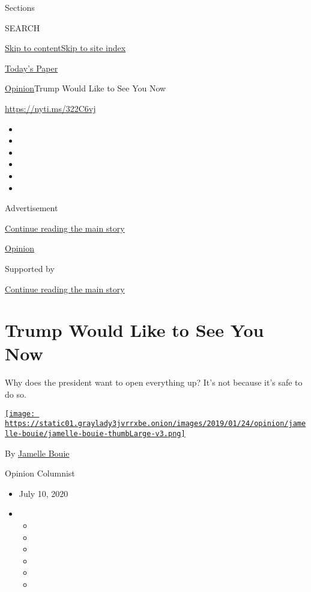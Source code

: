 Sections

SEARCH

\protect\hyperlink{site-content}{Skip to
content}\protect\hyperlink{site-index}{Skip to site index}

\href{https://myaccount.nytimes3xbfgragh.onion/auth/login?response_type=cookie\&client_id=vi}{}

\href{https://www.nytimes3xbfgragh.onion/section/todayspaper}{Today's
Paper}

\href{/section/opinion}{Opinion}\textbar{}Trump Would Like to See You
Now

\href{https://nyti.ms/322C6vj}{https://nyti.ms/322C6vj}

\begin{itemize}
\item
\item
\item
\item
\item
\item
\end{itemize}

Advertisement

\protect\hyperlink{after-top}{Continue reading the main story}

\href{/section/opinion}{Opinion}

Supported by

\protect\hyperlink{after-sponsor}{Continue reading the main story}

\hypertarget{trump-would-like-to-see-you-now}{%
\section{Trump Would Like to See You
Now}\label{trump-would-like-to-see-you-now}}

Why does the president want to open everything up? It's not because it's
safe to do so.

\href{https://www.nytimes3xbfgragh.onion/column/jamelle-bouie}{\texttt{[image: https://static01.graylady3jvrrxbe.onion/images/2019/01/24/opinion/jamelle-bouie/jamelle-bouie-thumbLarge-v3.png]}}

By
\href{https://www.nytimes3xbfgragh.onion/column/jamelle-bouie}{Jamelle
Bouie}

Opinion Columnist

\begin{itemize}
\item
  July 10, 2020
\item
  \begin{itemize}
  \item
  \item
  \item
  \item
  \item
  \item
  \end{itemize}
\end{itemize}

